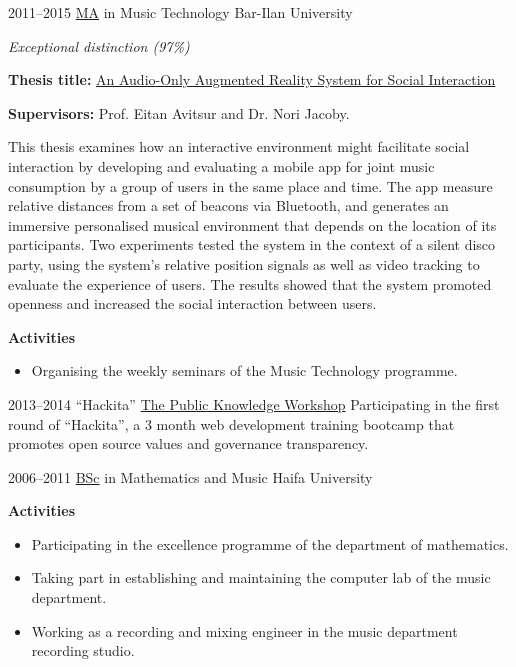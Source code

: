 \documentclass[]{friggeri-cv}
\begin{document}
\begin{entrylist}

    \entry
    {2011--2015}
    {\href{http://www.tomgurion.me/pdfs/MA.pdf}{MA} in Music Technology}
    {Bar-Ilan University}
    {
      \textit{Exceptional distinction (97\%)}

      \textbf{Thesis title:} \href{http://www.tomgurion.me/pdfs/Gurion - An Audio-Only Augmented Reality System for Social Interaction.pdf}{An Audio-Only Augmented Reality System for Social Interaction}

      \textbf{Supervisors:} Prof. Eitan Avitsur and Dr. Nori Jacoby.

      This thesis examines how an interactive environment might facilitate social interaction by developing and evaluating a mobile app for joint music consumption by a group of users in the same place and time.
      The app measure relative distances from a set of beacons via Bluetooth, and generates an immersive personalised musical environment that depends on the location of its participants.
      Two experiments tested the system in the context of a silent disco party, using the system's relative position signals as well as video tracking to evaluate the experience of users.
      The results showed that the system promoted openness and increased the social interaction between users.

      \textbf{Activities}
      \begin{itemize}
        \item
          Organising the weekly seminars of the Music Technology programme.
      \end{itemize}
    }

\end{entrylist}
\begin{entrylist}

    \entry
    {2013--2014}
    {“Hackita”}
    {\href{https://www.hasadna.org.il/en/}{The Public Knowledge Workshop}}
    {Participating in the first round of ``Hackita'', a 3 month web development training bootcamp that promotes open source values and governance transparency.}

\end{entrylist}
\begin{entrylist}

    \entry
    {2006--2011}
    {\href{http://www.tomgurion.me/pdfs/BSc.pdf}{BSc} in Mathematics and Music}
    {Haifa University}
    {
      \textbf{Activities}
      \begin{itemize}
        \item
          Participating in the excellence programme of the department of mathematics.
        \item
          Taking part in establishing and maintaining the computer lab of the music department.
        \item
          Working as a recording and mixing engineer in the music department recording studio.
      \end{itemize}
    }

\end{entrylist}
\end{document}
